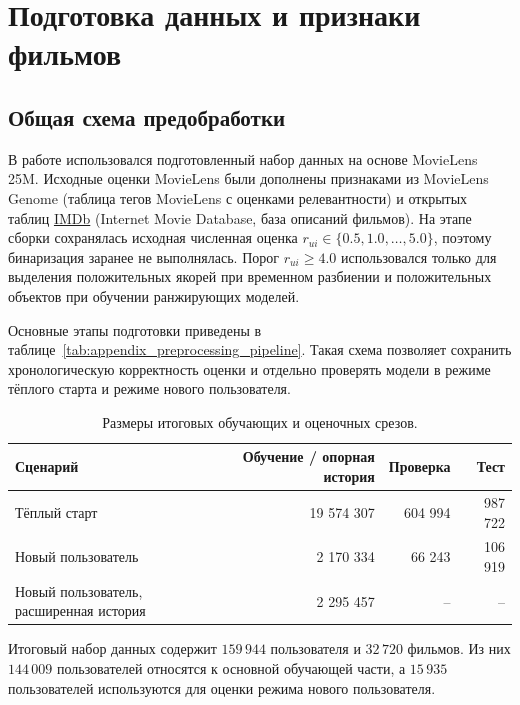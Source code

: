 \documentclass[12pt,fleqn]{article}
\begin{document}
\clearpage
\renewcommand{\refname}{Список литературы}



\clearpage
\appendix
\renewcommand{\thesection}{\Asbuk{section}}

\section{Подготовка данных и признаки фильмов}
\label{app:dataset_details}

\subsection{Общая схема предобработки}

В работе использовался подготовленный набор данных на основе MovieLens 25M.
Исходные оценки MovieLens были дополнены признаками из MovieLens Genome
(таблица тегов MovieLens с оценками релевантности) и открытых таблиц
\href{https://www.imdb.com/}{IMDb} (Internet Movie Database, база описаний
фильмов). На этапе сборки сохранялась исходная численная оценка
$r_{ui}\in\{0.5,1.0,\ldots,5.0\}$, поэтому бинаризация заранее не выполнялась.
Порог $r_{ui}\ge 4.0$ использовался только для выделения положительных якорей
при временном разбиении и положительных объектов при обучении ранжирующих
моделей.

Основные этапы подготовки приведены в таблице~\ref{tab:appendix_preprocessing_pipeline}.
Такая схема позволяет сохранить хронологическую корректность оценки и отдельно
проверять модели в режиме тёплого старта и режиме нового пользователя.

\begin{table}[H]
\centering
\small
\renewcommand{\arraystretch}{1.15}
\caption{Размеры итоговых обучающих и оценочных срезов.}
\label{tab:appendix_split_sizes}
\begin{tabular}{lrrr}
\toprule
Сценарий & Обучение / опорная история & Проверка & Тест \\
\midrule
Тёплый старт & 19 574 307 & 604 994 & 987 722 \\
Новый пользователь & 2 170 334 & 66 243 & 106 919 \\
Новый пользователь, расширенная история & 2 295 457 & -- & -- \\
\bottomrule
\end{tabular}
\end{table}

Итоговый набор данных содержит $159\,944$ пользователя и $32\,720$ фильмов. Из
них $144\,009$ пользователей относятся к основной обучающей части, а $15\,935$
пользователей используются для оценки режима нового пользователя.
\end{document}
